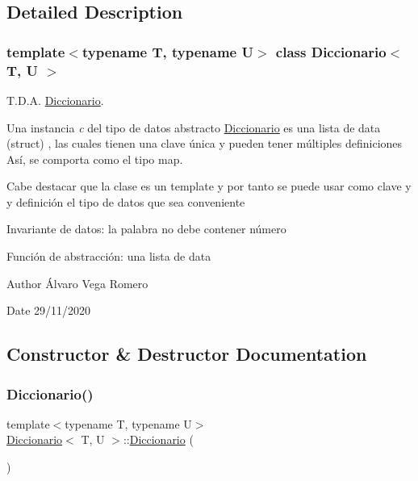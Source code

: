 \subsection{Detailed Description}
\subsubsection*{template$<$typename T, typename U$>$\newline
class Diccionario$<$ T, U $>$}

T.\+D.\+A. \hyperlink{classDiccionario}{Diccionario}. 

Una instancia {\itshape c} del tipo de datos abstracto {\ttfamily \hyperlink{classDiccionario}{Diccionario}} es una lista de data (struct) , las cuales tienen una clave única y pueden tener múltiples definiciones Así, se comporta como el tipo map.

Cabe destacar que la clase es un template y por tanto se puede usar como clave y y definición el tipo de datos que sea conveniente

Invariante de datos\+: la palabra no debe contener número

Función de abstracción\+: una lista de data

\begin{DoxyAuthor}{Author}
Álvaro Vega Romero 
\end{DoxyAuthor}
\begin{DoxyDate}{Date}
29/11/2020 
\end{DoxyDate}


\subsection{Constructor \& Destructor Documentation}
\mbox{\label{classDiccionario_adad32f7bfd34b7a8631ff5f26033b369}} 
\subsubsection{\texorpdfstring{Diccionario()}{Diccionario()}\hspace{0.1cm}{\footnotesize\ttfamily [1/2]}}
{\footnotesize\ttfamily template$<$typename T, typename U$>$ \\
\hyperlink{classDiccionario}{Diccionario}$<$ T, U $>$\+::\hyperlink{classDiccionario}{Diccionario} (\begin{DoxyParamCaption}{ }\end{DoxyParamCaption})\hspace{0.3cm}{\ttfamily [inline]}}



